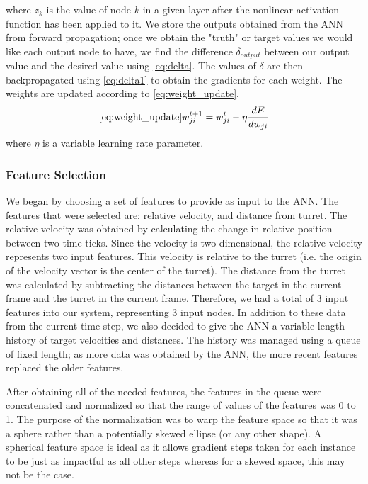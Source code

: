 \documentclass[11pt,letterpaper]{article}
\begin{document}
where $z_k$ is the value of node $k$ in a given layer after the nonlinear activation function has been applied to it. We store the outputs obtained from the ANN from forward propagation; once we obtain the "truth" or target values we would like each output node to have, we find the difference $\delta_{output}$ between our output value and the desired value using \eqref{eq:delta}. The values of $\delta$ are then backpropagated using \eqref{eq:delta1} to obtain the gradients for each weight. The weights are updated according to \eqref{eq:weight_update}.
\begin{align} 
\eqref{eq:weight_update}
w_{ji}^{t+1} = w_{ji}^{t} - \eta\frac{dE}{dw_{ji}}
\end{align}
where $\eta$ is a variable learning rate parameter.


\subsubsection{Feature Selection}
We began by choosing a set of features to provide as input to the ANN. The features that were selected are: relative velocity, and distance from turret. The relative velocity was obtained by calculating the change in relative position between two time ticks. Since the velocity is two-dimensional, the relative velocity represents two input features. This velocity is relative to the turret (i.e. the origin of the velocity vector is the center of the turret). The distance from the turret was calculated by subtracting the distances between the target in the current frame and the turret in the current frame. Therefore, we had a total of 3 input features into our system, representing 3 input nodes. In addition to these data from the current time step, we also decided to give the ANN a variable length history of target velocities and distances. The history was managed using a queue of fixed length; as more data was obtained by the ANN, the more recent features replaced the older features.

After obtaining all of the needed features, the features in the queue were concatenated and normalized so that the range of values of the features was 0 to 1. The purpose of the normalization was to warp the feature space so that it was a sphere rather than a potentially skewed ellipse (or any other shape). A spherical feature space is ideal as it allows gradient steps taken for each instance to be just as impactful as all other steps whereas for a skewed space, this may not be the case.
\end{document}
